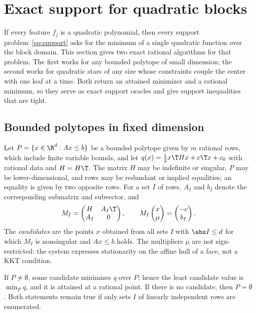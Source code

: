 \section{Exact support for quadratic blocks}\label{sec:quadratic}

If every feature $f_j$ is a quadratic polynomial, then every support
problem~\eqref{eq:support} asks for the minimum of a single quadratic
function over the block domain. This section gives two exact rational
algorithms for that problem. The first works for any bounded polytope of
small dimension; the second works for quadratic stars of any size whose
constraints couple the center with one leaf at a time. Both return an
attained minimizer and a rational minimum, so they serve as exact support
oracles and give support inequalities that are tight.

\subsection{Bounded polytopes in fixed dimension}\label{sec:polytope}

Let $P=\{x\in\R^d:Ax\le b\}$ be a bounded polytope given by $m$ rational
rows, which include finite variable bounds, and let
$q(x)=\tfrac12x\T Hx+c\T x+c_0$ with rational data and $H=H\T$. The matrix
$H$ may be indefinite or singular, $P$ may be lower-dimensional, and rows
may be redundant or implied equalities; an equality is given by two
opposite rows. For a set $I$ of rows, $A_I$ and $b_I$ denote the
corresponding submatrix and subvector, and
\begin{equation}\label{eq:kkt-system}
M_I=\begin{pmatrix}H&A_I\T\\ A_I&0\end{pmatrix},\qquad
M_I\begin{pmatrix}x\\ \mu\end{pmatrix}=\begin{pmatrix}-c\\ b_I\end{pmatrix}.
\end{equation}
The \emph{candidates} are the points $x$ obtained from all sets $I$ with
$\abs I\le d$ for which $M_I$ is nonsingular and $Ax\le b$ holds. The
multipliers $\mu$ are not sign-restricted: the system expresses
stationarity on the affine hull of a face, not a KKT condition.

\begin{theorem}\label{thm:polytope}
If $P\ne\emptyset$, some candidate minimizes $q$ over $P$; hence the least
candidate value is $\min_Pq$, and it is attained at a rational point. If
there is no candidate, then $P=\emptyset$. Both statements remain true if
only sets $I$ of linearly independent rows are enumerated.
\end{theorem}

